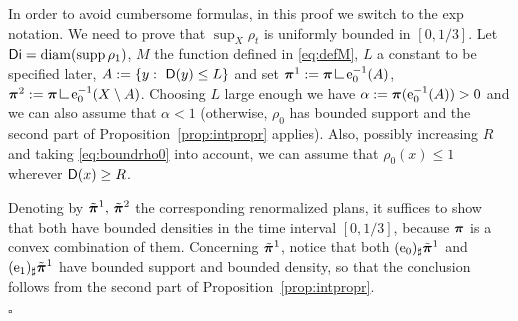 \documentclass[reqno,11pt]{article}
\numberwithin{equation}{section}
\newcommand{\ppi}{{\mbox{\boldmath$\pi$}}}
\newcommand{\sfD}{{\sf D}}
\newcommand{\supp}{\mathop{\rm supp}\nolimits}   %
\newenvironment{proof}{\removelastskip\par\medskip   %
\noindent{\em Proof.}
\rm}{\penalty-20\null\hfill$\square$\par\medbreak}
\newcommand{\e}{{\rm{e}}}                           %
\newcommand{\res}{\mathop{\hbox{\vrule height 7pt width .5pt depth 0pt
\vrule height .5pt width 6pt depth 0pt}}\nolimits} %
\begin{document}
\begin{proof}
In order to avoid cumbersome formulas, in this proof we switch to
the exp notation. We need to prove that $\sup_X\rho_t$ is uniformly
bounded in $[0,1/3]$. Let ${\sf Di}={\rm diam}(\supp\rho_1)$, $M$
the function defined in \eqref{eq:defM}, $L$ a constant to be
specified later, $A:=\{y:\ \sfD(y)\leq L\}$ and set
$\ppi^1:=\ppi\res{\e_0^{-1}(A)}$,
$\ppi^2:=\ppi\res{\e_0^{-1}(X\setminus A)}$. Choosing $L$ large
enough we have $\alpha:=\ppi(\e_0^{-1}(A))>0$ and we can also assume
that $\alpha<1$ (otherwise, $\rho_0$ has bounded support and the
second part of Proposition~\ref{prop:intpropr} applies). Also,
possibly increasing $R$ and taking \eqref{eq:boundrho0} into
account, we can assume that $\rho_0(x)\leq 1$ wherever $\sfD(x)\geq R$.

Denoting by $\tilde{\ppi}^1,\,\tilde{\ppi}^2$ the corresponding
renormalized plans, it suffices to show that both have bounded
densities in the time interval $[0,1/3]$, because $\ppi$ is a convex
combination of them. Concerning $\tilde{\ppi}^1$, notice that both
$(\e_0)_\sharp\tilde{\ppi}^1$ and $(\e_1)_\sharp\tilde{\ppi}^1$ have
bounded support and bounded density, so that the conclusion follows
from the second part of Proposition~\ref{prop:intpropr}.


\end{proof}
\end{document}
